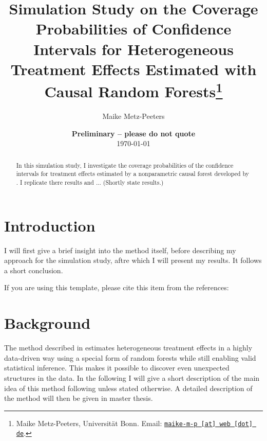 \documentclass[11pt, a4paper, leqno]{article}
\begin{document}
\title{Simulation Study on the Coverage Probabilities of Confidence Intervals for Heterogeneous Treatment Effects Estimated with Causal Random Forests\thanks{Maike Metz-Peeters, Universität Bonn. Email: \href{mailto:maike-m-p@web.de}{\nolinkurl{maike-m-p [at] web [dot] de}}.}}

\author{Maike Metz-Peeters}

\date{
{\bf Preliminary -- please do not quote} 
\\[1ex] 
\today
}

\maketitle


\begin{abstract}
	In this simulation study, I investigate the coverage probabilities of the confidence intervals for treatment effects estimated by a nonparametric causal forest developed by \citet{wa18}. I replicate there results and ... 
    (Shortly state results.)
    
\end{abstract}
\clearpage

\section{Introduction} %
\label{sec:introduction}

I will first give a brief insight into the method itself, before describing my approach for the simulation study, aftre which I will present my results. It follows a short conclusion.


If you are using this template, please cite this item from the references: \citet{GaudeckerEconProjectTemplates}


\section{Background} %
\label{sec:background}
The method described in \citet{wa18} estimates heterogeneous treatment effects in a highly data-driven way using a special form of random forests while still enabling valid statistical inference. This makes it possible to discover even unexpected structures in the data. In the following I will give a short description of the main idea of this method following \citet{wa18} unless stated otherwise. A detailed description of the method will then be given in master thesis. 
\end{document}
